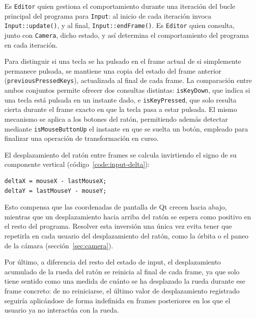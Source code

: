 Es \texttt{Editor} quien gestiona el comportamiento durante una iteración del bucle principal del programa para \texttt{Input}: al inicio de cada iteración invoca \texttt{Input::update()}, y al final, \texttt{Input::endFrame()}. Es \texttt{Editor} quien consulta, junto con \texttt{Camera}, dicho estado, y así determina el comportamiento del programa en cada iteración.

Para distinguir si una tecla se ha pulsado en el frame actual de si simplemente permanece pulsada, se mantiene una copia del estado del frame anterior (\texttt{previousPressedKeys}), actualizada al final de cada frame. La comparación entre ambos conjuntos permite ofrecer dos consultas distintas: \texttt{isKeyDown}, que indica si una tecla está pulsada en un instante dado, e \texttt{isKeyPressed}, que solo resulta cierta durante el frame exacto en que la tecla pasa a estar pulsada. El mismo mecanismo se aplica a los botones del ratón, permitiendo además detectar mediante \texttt{isMouseButtonUp} el instante en que se suelta un botón, empleado para finalizar una operación de transformación en curso.

El desplazamiento del ratón entre frames se calcula invirtiendo el signo de su componente vertical (código~\ref{code:input-delta}):

\begin{listing}[htb]
\begin{verbatim}
deltaX = mouseX - lastMouseX;
deltaY = lastMouseY - mouseY;
\end{verbatim}
\caption{Cálculo del desplazamiento del ratón entre frames.}
\label{code:input-delta}
\end{listing}

Esto compensa que las coordenadas de pantalla de Qt crecen hacia abajo, mientras que un desplazamiento hacia arriba del ratón se espera como positivo en el resto del programa. Resolver esta inversión una única vez evita tener que repetirla en cada usuario del desplazamiento del ratón, como la órbita o el paneo de la cámara (sección~\ref{sec:camera}).

Por último, a diferencia del resto del estado de input, el desplazamiento acumulado de la rueda del ratón se reinicia al final de cada frame, ya que solo tiene sentido como una medida de cuánto se ha desplazado la rueda durante ese frame concreto: de no reiniciarse, el último valor de desplazamiento registrado seguiría aplicándose de forma indefinida en frames posteriores en los que el usuario ya no interactúa con la rueda.